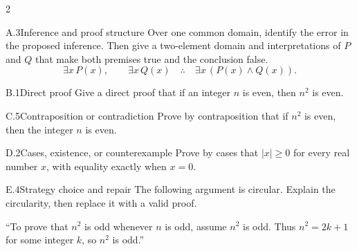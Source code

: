 \documentclass[9pt]{extarticle}
\begin{document}
\CoreWorkArea
\FormBreak
{}
\begin{multicols}{2}
\begin{CoreProblem}{A.3}{Inference and proof structure}
Over one common domain, identify the error in the proposed inference. Then give
a two-element domain and interpretations of $P$ and $Q$ that make both premises
true and the conclusion false.
\[
\exists x\,P(x),\qquad \exists x\,Q(x)
\quad\therefore\quad
\exists x\,(P(x)\land Q(x)).
\]
\end{CoreProblem}
\begin{CoreProblem}{B.1}{Direct proof}
Give a direct proof that if an integer $n$ is even, then $n^2$ is even.
\end{CoreProblem}
\begin{CoreProblem}{C.5}{Contraposition or contradiction}
Prove by contraposition that if $n^2$ is even, then the integer $n$ is even.
\end{CoreProblem}
\columnbreak
\begin{CoreProblem}{D.2}{Cases, existence, or counterexample}
Prove by cases that $|x|\ge 0$ for every real number $x$, with equality exactly when $x=0$.
\end{CoreProblem}
\begin{CoreProblem}{E.4}{Strategy choice and repair}
The following argument is circular. Explain the circularity, then replace it with a valid proof.

``To prove that $n^2$ is odd whenever $n$ is odd, assume $n^2$ is odd. Thus
$n^2=2k+1$ for some integer $k$, so $n^2$ is odd.''
\end{CoreProblem}
\end{multicols}
\CoreWorkArea
\FormBreak
{}
\end{document}
